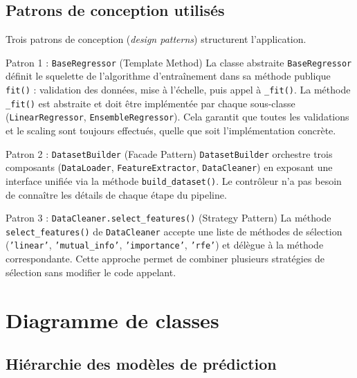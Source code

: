 \documentclass[12pt, a4paper, french]{report}
\begin{document}
\section{Patrons de conception utilisés}

Trois patrons de conception (\textit{design patterns}) structurent l'application.

\begin{patternbox}{Patron 1 : \texttt{BaseRegressor} (Template Method)}
La classe abstraite \texttt{BaseRegressor} définit le squelette de l'algorithme d'entraînement dans sa méthode publique \texttt{fit()} : validation des données, mise à l'échelle, puis appel à \texttt{\_fit()}. La méthode \texttt{\_fit()} est abstraite et doit être implémentée par chaque sous-classe (\texttt{LinearRegressor}, \texttt{EnsembleRegressor}).
Cela garantit que toutes les validations et le scaling sont toujours effectués, quelle que soit l'implémentation concrète.
\end{patternbox}

\begin{patternbox}{Patron 2 : \texttt{DatasetBuilder} (Facade Pattern)}
\texttt{DatasetBuilder} orchestre trois composants (\texttt{DataLoader}, \texttt{FeatureExtractor}, \texttt{DataCleaner}) en exposant une interface unifiée via la méthode \texttt{build\_dataset()}. Le contrôleur n'a pas besoin de connaître les détails de chaque étape du pipeline.
\end{patternbox}

\begin{patternbox}{Patron 3 : \texttt{DataCleaner.select\_features()} (Strategy Pattern)}
La méthode \texttt{select\_features()} de \texttt{DataCleaner} accepte une liste de méthodes de sélection (\texttt{'linear'}, \texttt{'mutual\_info'}, \texttt{'importance'}, \texttt{'rfe'}) et délègue à la méthode correspondante.
Cette approche permet de combiner plusieurs stratégies de sélection sans modifier le code appelant.
\end{patternbox}

\chapter{Diagramme de classes}

\section{Hiérarchie des modèles de prédiction}
\end{document}
